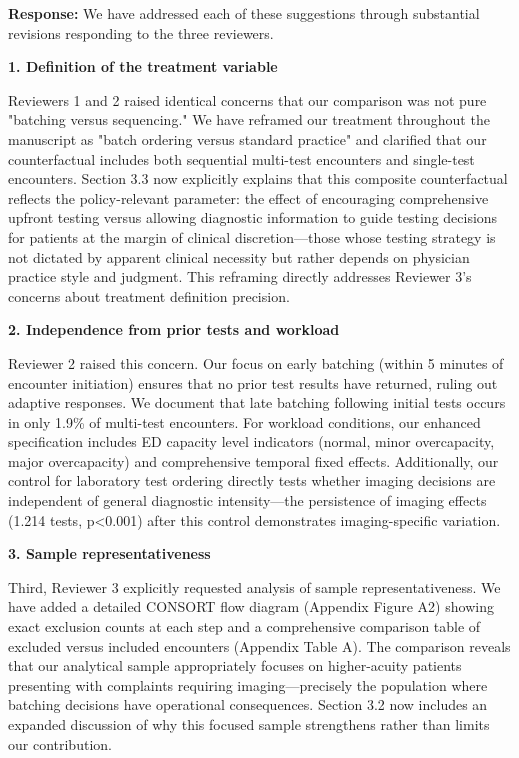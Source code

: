 \documentclass[11pt]{article}
\newcommand{\1}{\hbox{\rm 1\kern-.35em 1}}
\begin{document}
\noindent\textbf{Response:} \color{blue}We have addressed each of these suggestions through substantial revisions responding to the three reviewers.

\textbf{1. Definition of the treatment variable}

Reviewers 1 and 2 raised identical concerns that our comparison was not pure "batching versus sequencing." We have reframed our treatment throughout the manuscript as "batch ordering versus standard practice" and clarified that our counterfactual includes both sequential multi-test encounters and single-test encounters. Section 3.3 now explicitly explains that this composite counterfactual reflects the policy-relevant parameter: the effect of encouraging comprehensive upfront testing versus allowing diagnostic information to guide testing decisions for patients at the margin of clinical discretion—those whose testing strategy is not dictated by apparent clinical necessity but rather depends on physician practice style and judgment. This reframing directly addresses Reviewer 3's concerns about treatment definition precision.

\textbf{2. Independence from prior tests and workload}

Reviewer 2 raised this concern. Our focus on early batching (within 5 minutes of encounter initiation) ensures that no prior test results have returned, ruling out adaptive responses. We document that late batching following initial tests occurs in only 1.9\% of multi-test encounters. For workload conditions, our enhanced specification includes ED capacity level indicators (normal, minor overcapacity, major overcapacity) and comprehensive temporal fixed effects. Additionally, our control for laboratory test ordering directly tests whether imaging decisions are independent of general diagnostic intensity—the persistence of imaging effects (1.214 tests, p<0.001) after this control demonstrates imaging-specific variation.

\textbf{3. Sample representativeness}

Third, Reviewer 3 explicitly requested analysis of sample representativeness. We have added a detailed CONSORT flow diagram (Appendix Figure A2) showing exact exclusion counts at each step and a comprehensive comparison table of excluded versus included encounters (Appendix Table A). The comparison reveals that our analytical sample appropriately focuses on higher-acuity patients presenting with complaints requiring imaging—precisely the population where batching decisions have operational consequences. Section 3.2 now includes an expanded discussion of why this focused sample strengthens rather than limits our contribution.
\end{document}
